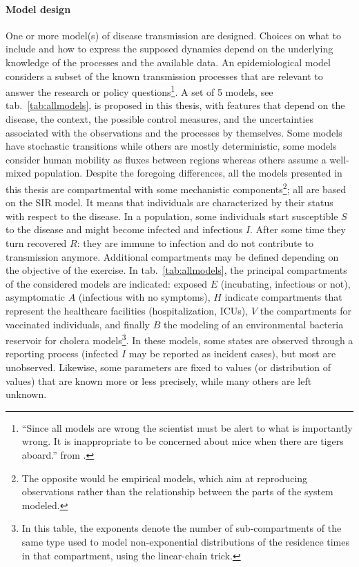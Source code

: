 \paragraph{Model design} One or more model(s) of disease transmission are designed. Choices on what to include and how to express the supposed dynamics depend on the underlying knowledge of the processes and the available data. An epidemiological model considers a subset of the known transmission processes that are relevant to answer the research or policy questions\footnote[][]{“Since all models are wrong the scientist must be alert to what is importantly wrong. It is inappropriate to be concerned about mice when there are tigers aboard.” from .}. A set of 5 models, see tab.~\ref{tab:allmodels}, is proposed in this thesis, with features that depend on the disease, the context, the possible control measures, and the uncertainties associated with the observations and the processes by themselves. Some models have stochastic transitions while others are mostly deterministic, some models consider human mobility as fluxes between regions whereas others assume a well-mixed population. Despite the foregoing differences, all the models presented in this thesis are compartmental with some mechanistic components\footnote{The opposite would be empirical models, which aim at reproducing observations rather than the relationship between the parts of the system modeled.}; all are based on the SIR model. It means that individuals are characterized by their status with respect to the disease. In a population, some individuals start susceptible $S$ to the disease and might become infected and infectious $I$. After some time they turn recovered $R$: they are immune to infection and do not contribute to transmission anymore. %
Additional compartments may be defined depending on the objective of the exercise. In tab.~\ref{tab:allmodels}, the principal compartments of the considered models are indicated: exposed $E$ (incubating, infectious or not), asymptomatic $A$ (infectious with no symptoms), $H$ indicate compartments that represent the healthcare facilities (hospitalization, ICUs), $V$ the compartments for vaccinated individuals, and finally $B$ the modeling of an environmental bacteria reservoir for cholera models\footnote{In this table, the exponents denote the number of sub-compartments of the same type used to model non-exponential distributions of the residence times in that compartment, using the linear-chain trick.}.
In these models, some states are observed through a reporting process (\eg infected $I$ may be reported as incident cases), but most are unobserved. Likewise, some parameters are fixed to values (or distribution of values) that are known more or less precisely, while many others are left unknown.

